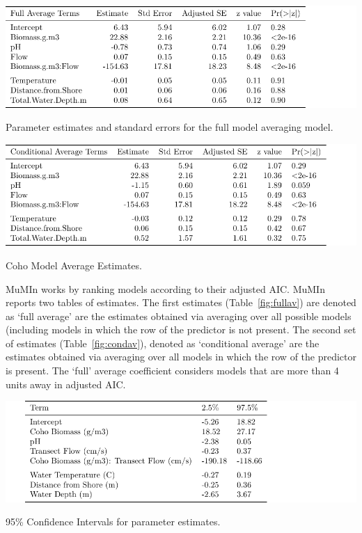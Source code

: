 \vspace{5mm}



\begin{table}[H]
\includegraphics{Chapter5Images/fullAV.pdf}
\caption{\hspace{1mm} Parameter estimates and standard errors for the full model averaging model.}
\label{fig:fullav}
\end{table}

\begin{table}[H]
\includegraphics{Chapter5Images/condAV.pdf}
\caption{\hspace{1mm} Coho Model Average Estimates.}
\label{fig:condav}
\end{table}



 MuMIn works by ranking models according to their adjusted AIC. MuMIn reports two tables of estimates. The first estimates (Table~\ref{fig:fullav}) are denoted as `full average' are the estimates obtained via averaging over all possible models (including models in which the row of the predictor is not present. The second set of estimates (Table~\ref{fig:condav}), denoted as `conditional average' are the estimates obtained via averaging over all models in which the row of the predictor is present. The `full' average coefficient considers models that are more than 4 units away in adjusted AIC. 

\vspace{5mm}


\begin{table}[H]
\includegraphics{Chapter5Images/95conf_coho.pdf}
\caption{\hspace{1mm} 95\% Confidence Intervals for parameter estimates.}
\label{fig:co95}
\end{table}






